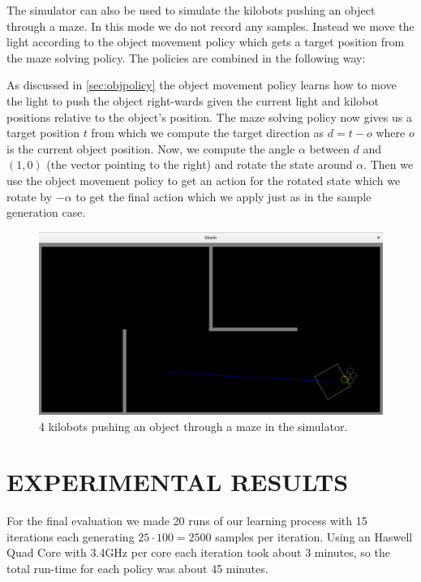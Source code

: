\documentclass[twoside]{article}
\begin{document}
The simulator can also be used to simulate the kilobots pushing an object
through a maze. In this mode we do not record any samples. Instead we move the
light according to the object movement policy which gets a target position from
the maze solving policy. The policies are combined in the following way:

As discussed in \ref{sec:objpolicy} the object movement policy learns
how to move the light to push the object right-wards given the current light
and kilobot positions relative to the object's position. The maze solving policy
now gives us a target position $t$ from which we compute the target direction as
$d = t - o$ where $o$ is the current object position. Now, we compute the angle
$\alpha$ between $d$ and $(1, 0)$ (the vector pointing to the right) and rotate
the state around $\alpha$. Then we use the object movement policy to get an
action for the rotated state which we rotate by $-\alpha$ to get the final
action which we apply just as in the sample generation case.

\begin{figure}[!htb]
    \centering
    \includegraphics[width=0.9\linewidth]{figures/simulator_maze.png}
    \caption{4 kilobots pushing an object through a maze in the simulator.}
    \label{fig:simulator}
\end{figure}

\section{EXPERIMENTAL RESULTS}

For the final evaluation we made 20 runs of our learning process with 15
iterations each generating $25 \cdot 100 = 2500$ samples per iteration. Using
an Haswell Quad Core with 3.4GHz per core each iteration took about 3 minutes,
so the total run-time for each policy was about 45 minutes.
\end{document}
